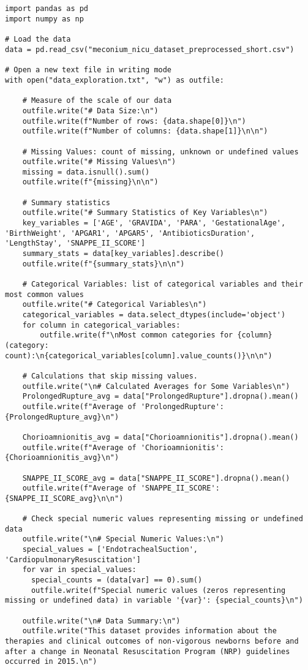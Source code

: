 \documentclass[11pt]{article}
\begin{document}
\begin{verbatim}


import pandas as pd
import numpy as np

# Load the data
data = pd.read_csv("meconium_nicu_dataset_preprocessed_short.csv")

# Open a new text file in writing mode
with open("data_exploration.txt", "w") as outfile:

    # Measure of the scale of our data
    outfile.write("# Data Size:\n")
    outfile.write(f"Number of rows: {data.shape[0]}\n")
    outfile.write(f"Number of columns: {data.shape[1]}\n\n")

    # Missing Values: count of missing, unknown or undefined values
    outfile.write("# Missing Values\n")
    missing = data.isnull().sum()
    outfile.write(f"{missing}\n\n")

    # Summary statistics
    outfile.write("# Summary Statistics of Key Variables\n")
    key_variables = ['AGE', 'GRAVIDA', 'PARA', 'GestationalAge', 'BirthWeight', 'APGAR1', 'APGAR5', 'AntibioticsDuration', 'LengthStay', 'SNAPPE_II_SCORE']
    summary_stats = data[key_variables].describe()
    outfile.write(f"{summary_stats}\n\n")

    # Categorical Variables: list of categorical variables and their most common values
    outfile.write("# Categorical Variables\n")
    categorical_variables = data.select_dtypes(include='object')
    for column in categorical_variables:
        outfile.write(f"\nMost common categories for {column} (category: count):\n{categorical_variables[column].value_counts()}\n\n")

    # Calculations that skip missing values.
    outfile.write("\n# Calculated Averages for Some Variables\n")
    ProlongedRupture_avg = data["ProlongedRupture"].dropna().mean()
    outfile.write(f"Average of 'ProlongedRupture': {ProlongedRupture_avg}\n")

    Chorioamnionitis_avg = data["Chorioamnionitis"].dropna().mean()
    outfile.write(f"Average of 'Chorioamnionitis': {Chorioamnionitis_avg}\n")

    SNAPPE_II_SCORE_avg = data["SNAPPE_II_SCORE"].dropna().mean()
    outfile.write(f"Average of 'SNAPPE_II_SCORE': {SNAPPE_II_SCORE_avg}\n\n")

    # Check special numeric values representing missing or undefined data
    outfile.write("\n# Special Numeric Values:\n")
    special_values = ['EndotrachealSuction', 'CardiopulmonaryResuscitation']
    for var in special_values:
      special_counts = (data[var] == 0).sum()
      outfile.write(f"Special numeric values (zeros representing missing or undefined data) in variable '{var}': {special_counts}\n")

    outfile.write("\n# Data Summary:\n")
    outfile.write("This dataset provides information about the therapies and clinical outcomes of non-vigorous newborns before and after a change in Neonatal Resuscitation Program (NRP) guidelines occurred in 2015.\n")


\end{verbatim}
\end{document}

